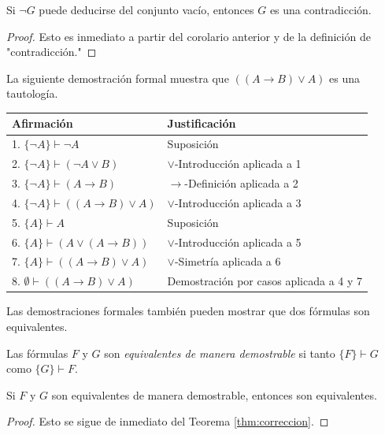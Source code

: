 \message{ !name(main.tex)}\documentclass[12pt,a4paper]{book}
\makeatletter
\newcommand{\comillas}[1]{"#1"}
\newenvironment{derivacion}{%
  \begingroup
  \renewcommand{\arraystretch}{1.35}
  \begin{center}
  \begin{tabular}{@{}l l@{}}
    \textbf{Afirmación} & \textbf{Justificación}\\
    \hline
}{%
  \end{tabular}
  \end{center}
  \endgroup
}
\makeatother
\begin{document}
    \begin{corolario}\label{cor:contradiccion-formal}
        Si $\neg G$ puede deducirse del conjunto vacío, entonces $G$ es una contradicción.
    \end{corolario}
    \begin{proof}
        Esto es inmediato a partir del corolario anterior y de la definición de \comillas{contradicción.}
    \end{proof}

    \begin{ejemplo}\label{ej:tautologia-implicacion}
        La siguiente demostración formal muestra que $((A\rightarrow B)\vee A)$ es una tautología.

        \begin{derivacion}
            1. $\{\neg A\}\vdash\neg A$ & Suposición\\
            2. $\{\neg A\}\vdash(\neg A\vee B)$ & $\vee$-Introducción aplicada a 1\\
            3. $\{\neg A\}\vdash(A\rightarrow B)$ & $\rightarrow$-Definición aplicada a 2\\
            4. $\{\neg A\}\vdash((A\rightarrow B)\vee A)$ & $\vee$-Introducción aplicada a 3\\
            5. $\{A\}\vdash A$ & Suposición\\
            6. $\{A\}\vdash(A\vee(A\rightarrow B))$ & $\vee$-Introducción aplicada a 5\\
            7. $\{A\}\vdash((A\rightarrow B)\vee A)$ & $\vee$-Simetría aplicada a 6\\
            8. $\emptyset\vdash((A\rightarrow B)\vee A)$ & Demostración por casos aplicada a 4 y 7\\
        \end{derivacion}
    \end{ejemplo}

    Las demostraciones formales también pueden mostrar que dos fórmulas son equivalentes.

    \begin{definicion}\label{def:equivalentes-demostrablemente}
        Las fórmulas $F$ y $G$ son \textit{equivalentes de manera demostrable} si tanto $\{F\}\vdash G$ como $\{G\}\vdash F$.
    \end{definicion}

    \begin{corolario}\label{cor:demostrable-implica-equivalente}
        Si $F$ y $G$ son equivalentes de manera demostrable, entonces son equivalentes.
    \end{corolario}
    \begin{proof}
        Esto se sigue de inmediato del Teorema \ref{thm:correccion}.
    \end{proof}
\end{document}
